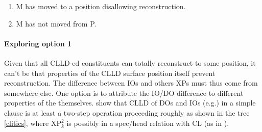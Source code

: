 \documentclass[output=paper]{langsci/langscibook}
\begin{document}
\begin{enumerate}
\item M has moved to a position disallowing reconstruction.
\item M has not moved from P.
\end{enumerate}

\paragraph*{Exploring option 1} Given  that all \gls{CLLD}-ed constituents can
totally reconstruct to some position, it can't be that properties of the
\gls{CLLD} surface position itself prevent
reconstruction. The difference between \glspl{IO} and others XPs must thus come
from somewhere else. One option is to attribute the IO/DO difference to
different properties of the  themselves.  \cite{Angelopoulo2017} show
that \gls{CLLD} of \glspl{DO} and \glspl{IO} (e.g.)
in a simple clause is at least a two-step operation proceeding roughly as shown
in the tree \eqref{clitics}, where XP$_k^2$ is possibly in a spec/head relation
with CL (as in \citealt{Sportiche1996}).
\end{document}
